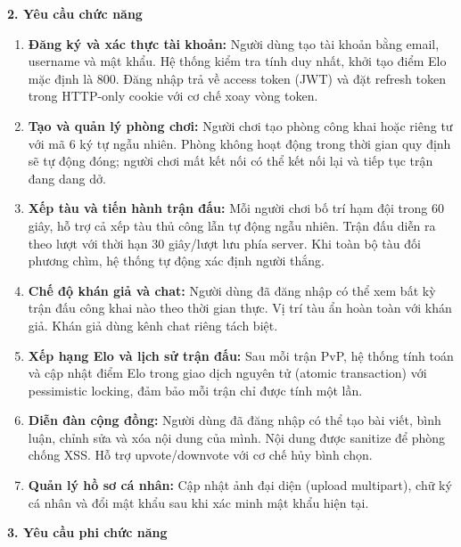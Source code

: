 \documentclass[13pt, a4paper]{extreport}
\begin{document}
\textbf{2. Yêu cầu chức năng}

\begin{enumerate}[label=\alph*.]
  \item \textbf{Đăng ký và xác thực tài khoản:} Người dùng tạo tài khoản bằng email, username và
    mật khẩu. Hệ thống kiểm tra tính duy nhất, khởi tạo điểm Elo mặc định là 800. Đăng nhập trả
    về access token (JWT) và đặt refresh token trong HTTP-only cookie với cơ chế xoay vòng token.

  \item \textbf{Tạo và quản lý phòng chơi:} Người chơi tạo phòng công khai hoặc riêng tư với mã
    6 ký tự ngẫu nhiên. Phòng không hoạt động trong thời gian quy định sẽ tự động đóng; người chơi
    mất kết nối có thể kết nối lại và tiếp tục trận đang dang dở.

  \item \textbf{Xếp tàu và tiến hành trận đấu:} Mỗi người chơi bố trí hạm đội trong 60 giây,
    hỗ trợ cả xếp tàu thủ công lẫn tự động ngẫu nhiên. Trận đấu diễn ra theo lượt với thời hạn
    30 giây/lượt lưu phía server. Khi toàn bộ tàu đối phương chìm, hệ thống tự động xác định
    người thắng.

  \item \textbf{Chế độ khán giả và chat:} Người dùng đã đăng nhập có thể xem bất kỳ trận đấu
    công khai nào theo thời gian thực. Vị trí tàu ẩn hoàn toàn với khán giả. Khán giả dùng kênh
    chat riêng tách biệt.

  \item \textbf{Xếp hạng Elo và lịch sử trận đấu:} Sau mỗi trận PvP, hệ thống tính toán và cập
    nhật điểm Elo trong giao dịch nguyên tử (atomic transaction) với pessimistic locking, đảm bảo
    mỗi trận chỉ được tính một lần.

  \item \textbf{Diễn đàn cộng đồng:} Người dùng đã đăng nhập có thể tạo bài viết, bình luận,
    chỉnh sửa và xóa nội dung của mình. Nội dung được sanitize để phòng chống XSS. Hỗ trợ
    upvote/downvote với cơ chế hủy bình chọn.

  \item \textbf{Quản lý hồ sơ cá nhân:} Cập nhật ảnh đại diện (upload multipart), chữ ký cá nhân
    và đổi mật khẩu sau khi xác minh mật khẩu hiện tại.
\end{enumerate}

\textbf{3. Yêu cầu phi chức năng}
\end{document}
